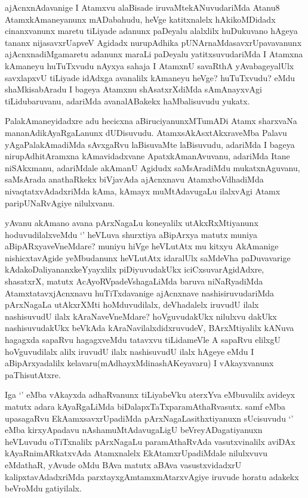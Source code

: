 \begin{artha}
ajAcnxnAdavanige I Atamxvu alaBisade iruvaMtekANuvudariMda Atanu8 AtamxkAmaneyanunx mADabahudu, heVge katitxnalelx hAkikoMDidadx cinanxvanunx maretu tiLiyade adanunx paDeyalu alalxlilx huDukuvano hAgeya tananx nijasavxrUapveV Agidadx nurupAdhika pUNArnaMdasavxrUpavavanunx ajAcnxnadiMgamaretu adanunx maraLi paDeyalu yatitxsuvudariMda I Atamxna kAmaneyu huTuTxvudu nAyxya sahaja I AtamxnU savaRthA yAvabageyalUlx savxlapxvU tiLiyade idAdxga avanalilx kAmaneyu heVge? huTuTxvudu? eMdu shaMkisabAradu I bageya Atamxnu shAsatxrXdiMda sAmAnayxvAgi tiLidubaruvanu, adariMda avanalABakekx haMbalisuvudu yukatx. 

PalakAmaneyidadxre adu hecicxna aBiruciyanunxMTumADi Atamx sharxvaNa mananAdikAyaRgaLanunx dUDisuvudu. AtamxsAkAsxtAkxraveMba Palavu yAgaPalakAmadiMda sAvxgaRvu laBisuvaMte laBisuvudu, adariMda I bageya nirupAdhitAramxna kAmavidadxvane ApatxkAmanAvuvanu, adariMda Itane niSAkxmanu, adariMdale akAmanU Agidudx saMsAradiMdu mukatxnAguvanu, saMsArada anathaRkekx biVjavAda ajAcnxnavu AtamxboVdhadiMda nivaqtatxvAdadxriMda kAma, kAmayx muMtAdavugaLu ilalxvAgi Atamx paripUNaRvAgiye nilulxvanu.
\end{artha}

\begin{artha}
yAvanu akAmano avana pArxNagaLu koneyalilx utAkxRxMtiyanunx hoduvudilalxveMdu `\stext' heVLuva shurxtiya aBipArxya matutx muniya aBipARxyaveVneMdare? muniyu hiVge heVLutAtx mu kitxyu AkAmanige nishicxtavAgide yeMbudanunx heVLutAtx idaralUlx saMdeVha paDuvavarige kAdakoDaliyananxkeYyayxlilx piDiyuvudakUkx iciCxsuvarAgidAdxre, shasatxrX, matutx AcAyoRVpadeVshagaLiMda baruva niNaRyadiMda AtamxtatavxjAcnxnavu huTiTxdavanige ajAcnxnave nashisiruvudariMda pArxNagaLa utAkxrXMti hoMduvudilalx, deVhadalelx iruvudU ilalx nashisuvudU ilalx kAraNaveVneMdare? hoVguvudakUkx nilulxvu dakUkx nashisuvudakUkx beVkAda kAraNavilalxdidxruvudeV, BArxMtiyalilx kANuva hagagxda sapaRvu hagagxveMdu tatavxvu tiLidameVle A sapaRvu elilxgU hoVguvudilalx alilx iruvudU ilalx nashisuvudU ilalx hAgeye eMdu I aBipArxyadalilx kelavaru(mAdhayxMdinashAKeyavaru) I vAkayxvanunx paThisutAtxre.
\end{artha}

\begin{artha}
Iga `\stext' eMba vAkayxda adhaRvanunx tiLiyabeVku aterxYva eMbuvalilx avideyx matutx adara kAyaRgaLiMda biDalapxTaTxparamAthaRvasutx. samf eMba upasagaRvu EkAamxsavxrUpadiMda pArxNagaLasithxtiyanuxn sUcisuvudu `\stext' eMba kirxyApadavu nAshamuMtAdavugaLigU beVreyADagatiyanuxn heVLuvudu oTiTxnalilx pArxNagaLu paramAthaRvAda vasutxvinalilx aviDAx kAyaRnimARkatxvAda Atamxnalelx EkAtamxrUpadiMdale nilulxvuvu eMdathaR, yAvude oMdu BAva matutx aBAva vasustxvidadxrU kalipxtavAdadxriMda parxtayxgAmtamxmAtarxvAgiye iruvude horatu adakekx beVroMdu gatiyilalx. 
\end{artha}

